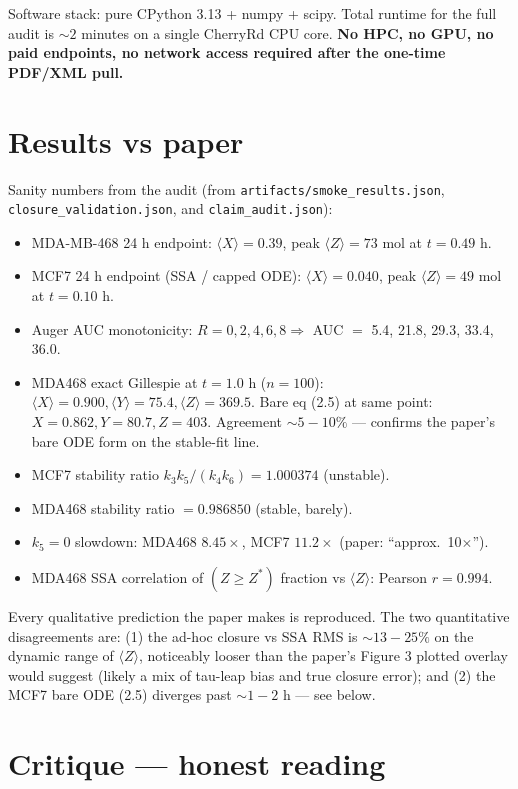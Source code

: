 \documentclass[11pt]{article}
\begin{document}
Software stack: pure CPython 3.13 + numpy + scipy. Total runtime for the full audit is
$\sim 2$ minutes on a single CherryRd CPU core. \textbf{No HPC, no GPU, no paid endpoints,
no network access required after the one-time PDF/XML pull.}

\section{Results vs paper}

Sanity numbers from the audit (from \texttt{artifacts/smoke\_results.json},
\texttt{closure\_validation.json}, and \texttt{claim\_audit.json}):

\begin{itemize}
    \item MDA-MB-468 24 h endpoint: $\langle X\rangle = 0.39$, peak $\langle Z\rangle = 73$ mol at $t=0.49$ h.
    \item MCF7 24 h endpoint (SSA / capped ODE): $\langle X\rangle = 0.040$, peak $\langle Z\rangle = 49$ mol at $t=0.10$ h.
    \item Auger AUC monotonicity: $R = 0, 2, 4, 6, 8 \Rightarrow$ AUC $=$ 5.4, 21.8, 29.3, 33.4, 36.0.
    \item MDA468 exact Gillespie at $t=1.0$ h ($n=100$): $\langle X\rangle=0.900, \langle Y\rangle=75.4, \langle Z\rangle=369.5$.
      Bare eq (2.5) at same point: $X=0.862, Y=80.7, Z=403$. Agreement $\sim 5\!-\!10\%$ ---
      confirms the paper's bare ODE form on the stable-fit line.
    \item MCF7 stability ratio $k_3 k_5/(k_4 k_6) = 1.000374$ (unstable).
    \item MDA468 stability ratio $= 0.986850$ (stable, barely).
    \item $k_5{=}0$ slowdown: MDA468 $8.45\times$, MCF7 $11.2\times$ (paper: ``approx.\ 10$\times$'').
    \item MDA468 SSA correlation of $(Z\ge Z^*)$ fraction vs $\langle Z\rangle$: Pearson $r = 0.994$.
\end{itemize}

Every qualitative prediction the paper makes is reproduced. The two quantitative disagreements are:
(1) the ad-hoc closure vs SSA RMS is $\sim 13\!-\!25\%$ on the dynamic range of $\langle Z\rangle$,
noticeably looser than the paper's Figure 3 plotted overlay would suggest (likely a mix of
tau-leap bias and true closure error); and (2) the MCF7 bare ODE (2.5) diverges past
$\sim 1\!-\!2$ h --- see below.

\section{Critique --- honest reading}\label{sec:critique}
\end{document}
